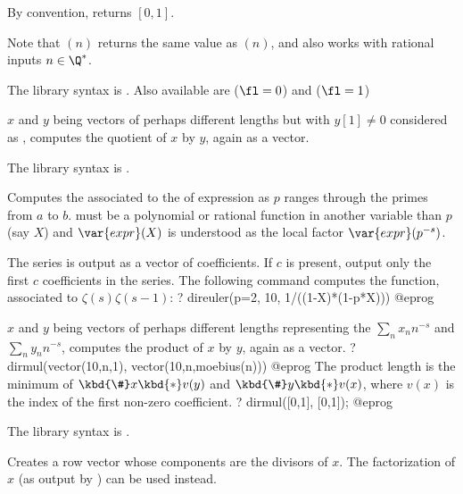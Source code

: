 By convention,  returns $[0,1]$.

Note that $(n)$ returns the same value as $(n)$,
and also works with rational inputs $n\in\Q^*$.

The library syntax is .
Also available are  ($\fl = 0$) and
 ($\fl = 1$)

\label{se:dirdiv}
$x$ and $y$ being vectors of perhaps different
lengths but with $y[1]\neq 0$ considered as , computes
the quotient of $x$ by $y$, again as a vector.

The library syntax is .

\label{se:direuler}
Computes the  associated to the
 of expression  as $p$ ranges through the primes
from $a$
to $b$.  must be a polynomial or rational function in another
variable than $p$ (say $X$) and $\var{expr}(X)$ is understood as the local
factor $\var{expr}(p^{-s})$.

The series is output as a vector of coefficients. If $c$ is present, output
only the first $c$ coefficients in the series. The following command computes
the  function, associated to $\zeta(s)\zeta(s-1)$:
\bprog
? direuler(p=2, 10, 1/((1-X)*(1-p*X)))
@eprog


\label{se:dirmul}
$x$ and $y$ being vectors of perhaps different lengths representing
the  $\sum_n x_n n^{-s}$ and $\sum_n y_n n^{-s}$,
computes the product of $x$ by $y$, again as a vector.
\bprog
? dirmul(vector(10,n,1), vector(10,n,moebius(n)))
@eprog\noindent
The product
length is the minimum of $\kbd{\#}x\kbd{*}v(y)$ and $\kbd{\#}y\kbd{*}v(x)$,
where $v(x)$ is the index of the first non-zero coefficient.
\bprog
? dirmul([0,1], [0,1]);
@eprog

The library syntax is .

\label{se:divisors}
Creates a row vector whose components are the
divisors of $x$. The factorization of $x$ (as output by ) can
be used instead.

